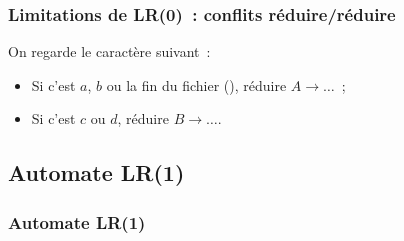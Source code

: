 \begin{frame}
    \frametitle{Limitations de LR(0)~: conflits réduire/réduire}

    \begin{center}
        
    \end{center}

    On regarde le caractère suivant~:
    \pause
    \begin{itemize}
        \item Si c’est $a$, $b$ ou la fin du fichier (\lozenge), réduire
            $A \to \dots$~;
        \pause
        \item Si c’est $c$ ou $d$, réduire $B \to \dots$.
    \end{itemize}
\end{frame}
\addtocounter{framenumber}{-1}

\subsection{Automate LR(1)}

\begin{frame}
    \frametitle{Automate LR(1)}

    
    \pause
    \maxsizebox{\textwidth}{0.8\textheight}{
        
    }
\end{frame}
\addtocounter{framenumber}{-1}
